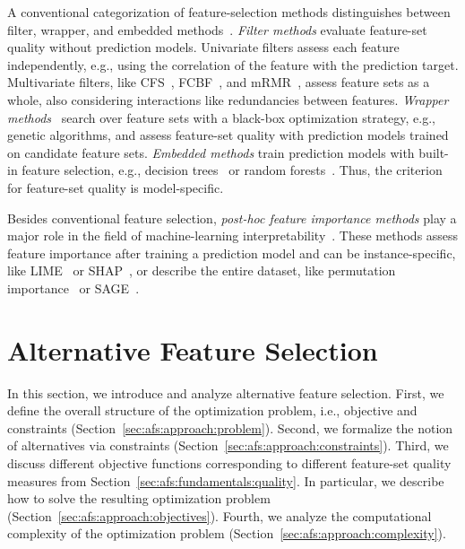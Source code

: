 \documentclass[iicol, sn-basic, Numbered]{sn-jnl} %
\theoremstyle{plain}
\theoremstyle{definition}
\begin{document}
A conventional categorization of feature-selection methods distinguishes between filter, wrapper, and embedded methods~\cite{guyon2003introduction}.
\emph{Filter methods} evaluate feature-set quality without prediction models.
Univariate filters assess each feature independently, e.g., using the correlation of the feature with the prediction target.
Multivariate filters, like CFS~\cite{hall1999correlation, hall2000correlation}, FCBF~\cite{yu2003feature}, and mRMR~\cite{peng2005feature}, assess feature sets as a whole, also considering interactions like redundancies between features.
\emph{Wrapper methods}~\cite{kohavi1997wrappers} search over feature sets with a black-box optimization strategy, e.g., genetic algorithms, and assess feature-set quality with prediction models trained on candidate feature sets.
\emph{Embedded methods} train prediction models with built-in feature selection, e.g., decision trees~\cite{breiman1984classification} or random forests~\cite{breiman2001random}.
Thus, the criterion for feature-set quality is model-specific.

Besides conventional feature selection, \emph{post-hoc feature importance methods} play a major role in the field of machine-learning interpretability~\cite{carvalho2019machine, molnar2020interpretable}.
These methods assess feature importance after training a prediction model and can be instance-specific, like LIME~\cite{ribeiro2016should} or SHAP~\cite{lundberg2017unified}, or describe the entire dataset, like permutation importance~\cite{breiman2001random} or SAGE~\cite{covert2020understanding}.

\section{Alternative Feature Selection}
\label{sec:afs:approach}

In this section, we introduce and analyze alternative feature selection.
First, we define the overall structure of the optimization problem, i.e., objective and constraints (Section~\ref{sec:afs:approach:problem}).
Second, we formalize the notion of alternatives via constraints (Section~\ref{sec:afs:approach:constraints}).
Third, we discuss different objective functions corresponding to different feature-set quality measures from Section~\ref{sec:afs:fundamentals:quality}.
In particular, we describe how to solve the resulting optimization problem (Section~\ref{sec:afs:approach:objectives}).
Fourth, we analyze the computational complexity of the optimization problem (Section~\ref{sec:afs:approach:complexity}).
\end{document}
